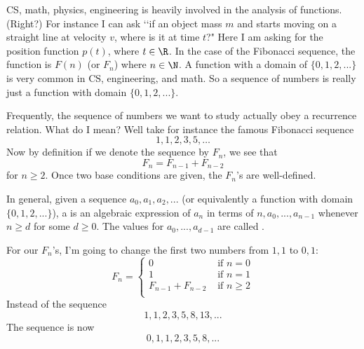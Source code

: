 \begin{comment}
=
P
\begin{bmatrix}
  0 & 1 & 1 \\
  1 & 0 & 0 \\
  0 & 1 & 1
\end{bmatrix}
\begin{bmatrix}
  \varphi' & 0       & 0 \\
  0        & \varphi & 0 \\
  0        & 0       & 0
\end{bmatrix}
P^{-1}
\]
where
\[
P =
\begin{bmatrix}
  1        & 1       & 0 \\
  -\varphi & \varphi & 0 \\
  1        & 1 & 1
\end{bmatrix}
\]
\end{comment}

CS, math, physics, engineering is heavily involved
in the analysis of functions. (Right?)
For instance I can ask
\lq\lq if an object mass $m$ and starts moving on a straight line
at velocity $v$,
where is it at time $t$?" Here I am asking for the position function
$p(t)$, where $t \in \R$.
In the case of the Fibonacci sequence, the function is $F(n)$ (or $F_n$) where
$n \in \N$.
A function with a domain of $\{0,1,2,...\}$ is very common in CS, engineering, and math.
So a sequence of numbers is really just a function with domain $\{0,1,2,...\}$.

Frequently, the sequence of numbers we want to 
study actually obey a recurrence relation.
What do I mean?
Well take for instance the famous Fibonacci sequence
\[
1, 1, 2, 3, 5, \ldots
\]
Now by definition if we denote the sequence by $F_n$, we see that
\[
F_n = F_{n-1} + F_{n-2}
\]
for $n \geq 2$.
Once two base conditions are given, the $F_n$'s are well-defined.

In general,
given a sequence $a_0, a_1, a_2, ...$ (or equivalently a function with domain $\{0, 1, 2, ...\}$),
a  is an algebraic expression of $a_n$ in terms of
$n, a_0, ..., a_{n-1}$
whenever $n \geq d$ for some $d \geq 0$.
The values for $a_0, ..., a_{d-1}$ are called
.

For our $F_n$'s, 
I'm going to change the first two numbers from $1,1$ to $0,1$:
\[
F_n
=
\begin{cases}
0 &\text{ if } n = 0 \\
1 &\text{ if } n = 1 \\
F_{n-1} + F_{n-2}  &\text{ if } n \geq 2 \\
\end{cases}
\]
Instead of the sequence
\[
1, 1, 2, 3, 5, 8, 13, ...
\]
The sequence is now
\[
0, 1, 1, 2, 3, 5, 8, ...
\]

